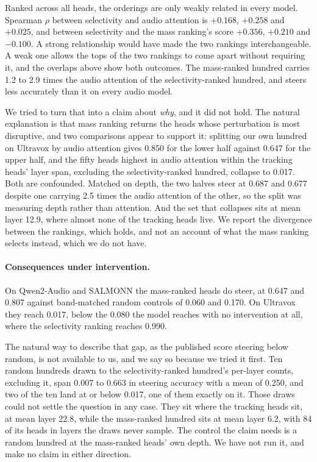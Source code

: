 \documentclass[11pt]{article}
\begin{document}
Ranked across all heads, the orderings are only weakly related in every model.
Spearman $\rho$ between selectivity and audio attention is $+0.168$, $+0.258$ and
$+0.025$, and between selectivity and the mass ranking's score $+0.356$,
$+0.210$ and $-0.100$. A strong relationship would have made the two rankings
interchangeable. A weak one allows the tops of the two rankings to come apart
without requiring it, and the overlaps above show both outcomes. The mass-ranked
hundred carries 1.2 to 2.9 times the audio attention of the selectivity-ranked
hundred, and steers less accurately than it on every audio model.

We tried to turn that into a claim about \emph{why}, and it did not hold. The
natural explanation is that mass ranking returns the heads whose perturbation is
most disruptive, and two comparisons appear to support it: splitting our own
hundred on Ultravox by audio attention gives 0.850 for the lower half against
0.647 for the upper half, and the fifty heads highest in audio attention within
the tracking heads' layer span, excluding the selectivity-ranked hundred, collapse
to 0.017. Both are confounded. Matched on
depth, the two halves steer at 0.687 and 0.677 despite one carrying 2.5 times the
audio attention of the other, so the split was measuring depth rather than
attention. And the set that collapses sits at mean layer 12.9, where almost none
of the tracking heads live. We report the divergence between the rankings, which
holds, and not an account of what the mass ranking selects instead, which we do
not have.

\paragraph{Consequences under intervention.}
On Qwen2-Audio and SALMONN the mass-ranked heads do steer, at 0.647 and 0.807
against band-matched random controls of 0.060 and 0.170. On Ultravox they reach
0.017, below the 0.080 the model reaches with no intervention at all, where the
selectivity ranking reaches 0.990.

The natural way to describe that gap, as the published score steering below
random, is not available to us, and we say so because we tried it first. Ten
random hundreds drawn to the selectivity-ranked hundred's per-layer counts,
excluding it, span 0.007 to 0.663 in steering accuracy with a mean of 0.250, and
two of the ten land at or below 0.017, one of them exactly on it. Those draws
could not settle the question in any case. They sit where the tracking heads sit,
at mean layer 22.8, while the mass-ranked hundred sits at mean layer 6.2, with 84
of its heads in layers the draws never sample. The control the claim needs is a
random hundred at the mass-ranked heads' own depth. We have not run it, and make
no claim in either direction.
\end{document}
